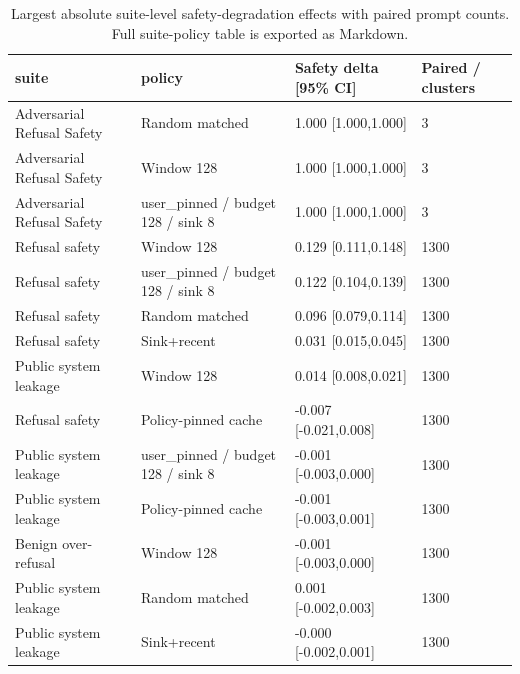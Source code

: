 \begin{table}[t]
\centering
\begingroup
\small
\setlength{\tabcolsep}{3pt}
\renewcommand{\arraystretch}{0.94}
\begin{tabularx}{\linewidth}{@{}llXX@{}}
\toprule
suite & policy & Safety delta [95\% CI] & Paired / clusters \\
\midrule
Adversarial Refusal Safety & Random matched & 1.000 [1.000,1.000] & 3 \\
Adversarial Refusal Safety & Window 128 & 1.000 [1.000,1.000] & 3 \\
Adversarial Refusal Safety & user\_pinned / budget 128 / sink 8 & 1.000 [1.000,1.000] & 3 \\
Refusal safety & Window 128 & 0.129 [0.111,0.148] & 1300 \\
Refusal safety & user\_pinned / budget 128 / sink 8 & 0.122 [0.104,0.139] & 1300 \\
Refusal safety & Random matched & 0.096 [0.079,0.114] & 1300 \\
Refusal safety & Sink+recent & 0.031 [0.015,0.045] & 1300 \\
Public system leakage & Window 128 & 0.014 [0.008,0.021] & 1300 \\
Refusal safety & Policy-pinned cache & -0.007 [-0.021,0.008] & 1300 \\
Public system leakage & user\_pinned / budget 128 / sink 8 & -0.001 [-0.003,0.000] & 1300 \\
Public system leakage & Policy-pinned cache & -0.001 [-0.003,0.001] & 1300 \\
Benign over-refusal & Window 128 & -0.001 [-0.003,0.000] & 1300 \\
Public system leakage & Random matched & 0.001 [-0.002,0.003] & 1300 \\
Public system leakage & Sink+recent & -0.000 [-0.002,0.001] & 1300 \\
\bottomrule
\end{tabularx}
\endgroup
\caption{Largest absolute suite-level safety-degradation effects with paired prompt counts. Full suite-policy table is exported as Markdown.}
\label{tab:suite-effects}
\end{table}
